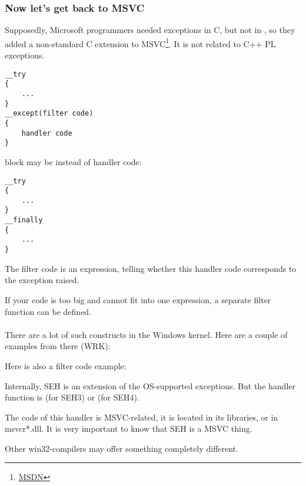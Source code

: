 \subsubsection{Now let's get back to MSVC}


Supposedly, Microsoft programmers needed exceptions in C, but not in \Cpp, so they added a non-standard C extension
to MSVC\footnote{\href{http://go.yurichev.com/17057}{MSDN}}.
It is not related to C++ \ac{PL} exceptions.

\begin{lstlisting}
__try
{
    ...
}
__except(filter code)
{
    handler code
}
\end{lstlisting}

 block may be instead of handler code:

\begin{lstlisting}
__try
{
    ...
}
__finally
{
    ...
}
\end{lstlisting}


The filter code is an expression, telling whether this handler code corresponds to the exception raised.

If your code is too big and cannot fit into one expression, a separate filter function can be defined.\\
\\
There are a lot of such constructs in the Windows kernel.
Here are a couple of examples from there (\ac{WRK}):





Here is also a filter code example:



Internally, SEH is an extension of the OS-supported exceptions.
But the handler function is  (for SEH3) or  (for SEH4).

The code of this handler is MSVC-related, it is located in its libraries, or in msvcr*.dll.
It is very important to know that SEH is a MSVC thing.

Other win32-compilers may offer something completely different.


